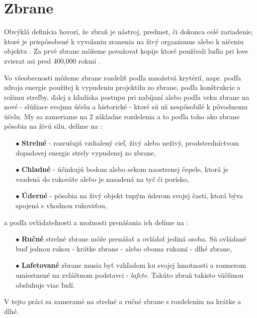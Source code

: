 
\section{Zbrane}
\label{sec:weapons}
Obvýklá definícia hovorí, že zbraň je nástroj, predmet, či dokonca celé zariadenie,
ktoré je prispôsobené k vyvolaniu zranenia na živý organizmus alebo k ničeniu objektu \cite{book:StrelneZbrane}.
Za prvé zbrane môžeme považovať kopije ktoré používali luďia pri love zvierat asi pred 400,000 rokmi \cite{prop:SpearHistory}.

Vo všeobecnosti môžeme zbrane rozdeliť podľa množstvá krytérií, napr. podľa zdroja energie použitej k vypudeniu projektilu zo zbrane,
podľa konštrukcie a režimu streľby, ďalej z hľadiska postupu pri nabíjaní alebo podľa veku zbrane na nové - slúžiace svojmu účelu a historické - ktoré sú už nespôsobilé k pôvodnemu účelu.
My sa zameriame na 2 základne rozdelenia a to poďla toho ako zbrane pôsobia na živú silu, delíme na \cite{book:StrelneZbrane}:
\begin{enumerate}
	\item[$\bullet$] \textbf{Strelné} - rozrušujú vzdialený cieľ, živý alebo neživý, prodstredníctvom dopadovej energie strely vypudenej zo zbrane,
	\item[$\bullet$] \textbf{Chladné} - účinkujú bodom alebo sekom naostrenej čepele, ktorá je vsadená do rukoväťe alebo je nasadená na tyč či porísko,
    \item[$\bullet$] \textbf{Úderné} - pôsobia na živý objekt tupým úderom svojej časti, ktorá býva spojená s vhodnou rukoväťou,
\end{enumerate}
a podľa ovládateľnosti a možnosti prenášania ich delíme na \cite{book:StrelneZbrane}:
\begin{enumerate}
	\item[$\bullet$] \textbf{Ručné} strelné zbrane môže prenášať a ovládať jediná osoba. Sú ovládané buď jednou rukou - krátke zbrane - alebo oboma rukami - dlhé zbrane,
	\item[$\bullet$] \textbf{Lafetované} zbrane musia byť vzhľadom ku svojej hmotnosti a rozmerom umiestnené na zvláštnom podstavci - \textit{lafete}. Takúto zbraň takisto väčšinou obsluhuje viac ľudí.
\end{enumerate}
V tejto práci sa zameramé na strelné a ručné zbrane s rozdelením na krátke a dlhé.
